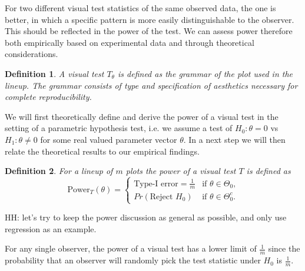 \documentclass{article}
\newcommand{\blue}[1]{{\color{blue} #1}}
\newcommand{\red}[1]{{\color{red} #1}}
\newtheorem{dfn}{Definition}[section]
\begin{document}
For two different visual test statistics of the same observed data, the one  is better, in which a specific pattern is more easily distinguishable to the observer. This should be reflected in the power of the test. We can assess power therefore both empirically based on experimental data and through theoretical considerations. 
\blue{

\begin{dfn} \label{dfn:test}
A \textit{visual test} $T_\theta$ is defined as the grammar \citep{wilkinson:1999} of the plot used in the lineup. The grammar consists of type and specification of aesthetics necessary for complete reproducibility.
\end{dfn}
}
\blue{We will first theoretically define and  derive the power of  a visual test in the setting of a parametric hypothesis test, i.e. we assume a test  of $H_0: \theta = 0$ vs $H_1: \theta \neq 0$ for some real valued parameter vector $\theta$. In a next step we will then relate the theoretical results to our empirical findings.}


\begin{dfn} \label{dfn:power}
For a lineup of $m$ plots the power of \blue{a visual test} $T$
 is defined as 
    \begin{equation*}
      \text{Power}_T(\theta)= 
        \begin{cases} 
              \text{Type-I error}=\frac1m & \text{if $\theta \in \Theta_0$,} \\
              Pr(\text{Reject } H_0) &\text{if $\theta \in \Theta^c_0$.}
        \end{cases}
    \end{equation*}
\end{dfn}

\red{HH: let's try to keep the power discussion as general as possible, and only use regression as an example.}

For any single observer, the power of a visual test has a lower limit of $\frac1m$ since the probability that an observer will randomly pick the test statistic under $H_0$ is $\frac1m$. 
\end{document}
